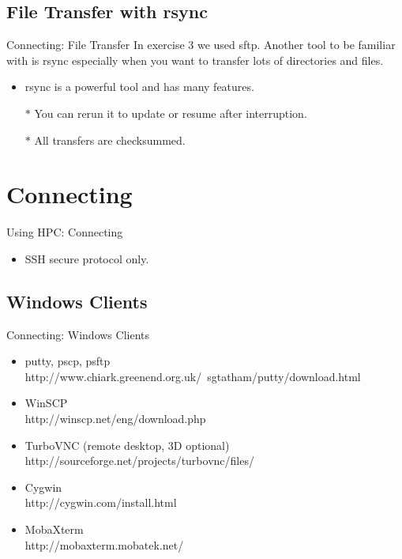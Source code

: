 \subsection{File Transfer with rsync}
\begin{frame}{Connecting: File Transfer}
In exercise 3 we used sftp. Another tool to be familiar with is rsync especially when you want to transfer lots of directories and files.
\begin{itemize}
\item{rsync is a powerful tool and has many features.}
\item[$\ast$]You can rerun it to update or resume after interruption.
\item[$\ast$]All transfers are checksummed.
\end{itemize}
\end{frame}
\section{Connecting}
\begin{frame}{Using HPC: Connecting}
\begin{itemize}
\item SSH secure protocol only.\hfill\\
\end{itemize}
\end{frame}

\subsection{Windows Clients}
\begin{frame}{Connecting: Windows Clients}
\begin{itemize}
\item<1-5> putty, pscp, psftp\hfill\\
\alert{\small http://www.chiark.greenend.org.uk/~sgtatham/putty/download.html}
\item<2-5> WinSCP\hfill\\
\alert{\small http://winscp.net/eng/download.php}
\item<3-5> TurboVNC \alert{\small (remote desktop, 3D optional)}\hfill\\
\alert{\small http://sourceforge.net/projects/turbovnc/files/}
\item<4-5> Cygwin \hfill\\
\alert{\small http://cygwin.com/install.html}\hfill\\
\item<6> MobaXterm\hfill\\
\alert{\small http://mobaxterm.mobatek.net/}
\end{itemize}
\end{frame}

